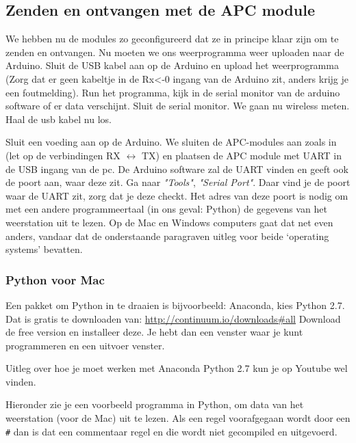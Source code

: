 \subsection{Zenden en ontvangen met de APC module}

We hebben nu de modules zo geconfigureerd dat ze in principe klaar zijn
om te zenden en ontvangen. Nu moeten we ons weerprogramma weer uploaden
naar de Arduino. Sluit de USB kabel aan op de Arduino en upload het
weerprogramma (Zorg dat er geen kabeltje in de Rx<-0 ingang van de Arduino zit, 
anders krijg je een foutmelding). Run het programma, kijk in de serial monitor van de
arduino software of er data verschijnt. Sluit de serial monitor. We gaan
nu wireless meten. Haal de usb kabel nu los.

Sluit een voeding aan op de Arduino.
We sluiten de APC-modules aan zoals in  (let op de
verbindingen RX $\longleftrightarrow$ TX) en plaatsen de APC module met UART
in de USB ingang van de pc. De Arduino software zal de UART vinden en
geeft ook de poort aan, waar deze zit. Ga naar \emph {"Tools"},
\emph{"Serial Port"}. Daar vind je de poort waar de UART zit, zorg dat je deze checkt.
Het adres van deze poort is nodig om met een andere programmeertaal (in ons
geval: Python) de gegevens van het weerstation uit te lezen. 
Op de Mac en Windows computers gaat dat net even anders, vandaar dat de onderstaande
paragraven uitleg voor beide `operating systems' bevatten.

\subsubsection{Python voor Mac}
Een pakket om Python in te draaien is bijvoorbeeld: Anaconda, kies Python 2.7.
Dat is gratis te downloaden van: \url{http://continuum.io/downloads#all}
Download de free version en installeer deze. Je hebt dan een venster waar je kunt
programmeren en een uitvoer venster. 

Uitleg over hoe je moet werken met Anaconda Python 2.7 kun je op Youtube wel vinden.

Hieronder zie je een voorbeeld programma in Python, om data van het weerstation 
(voor de Mac) uit te lezen.
Als een regel voorafgegaan wordt door een \verb|#| dan is dat een commentaar 
regel en die wordt niet gecompiled en uitgevoerd.

